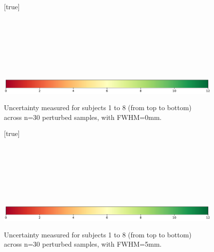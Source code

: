 \documentclass[lettersize,journal]{IEEEtran}
\begin{document}
\begin{landscape}
    \begin{figure}
        \vspace*{-2cm}
        \centering
        [true] \\
         \\
         \\
         \\
         \\
         \\
         \\
         \\
        \includegraphics*[width=.7\linewidth]{figures/colorbar_sigbit.pdf}
        \caption{Uncertainty measured for subjects 1 to 8 (from top to bottom) across n=30 perturbed samples, with FWHM=0mm. }
        \label{fig:uncertainty-maps-0mm}
    \end{figure}
\end{landscape}

\begin{landscape}
    \begin{figure}
        \vspace*{-2cm}
        \centering
        [true] \\
         \\
         \\
         \\
         \\
         \\
         \\
         \\
        \includegraphics*[width=.7\linewidth]{figures/colorbar_sigbit.pdf}
        \caption{Uncertainty measured for subjects 1 to 8 (from top to bottom) across n=30 perturbed samples, with FWHM=5mm. }
        \label{fig:uncertainty-maps-5mm}
    \end{figure}
\end{landscape}
\end{document}
